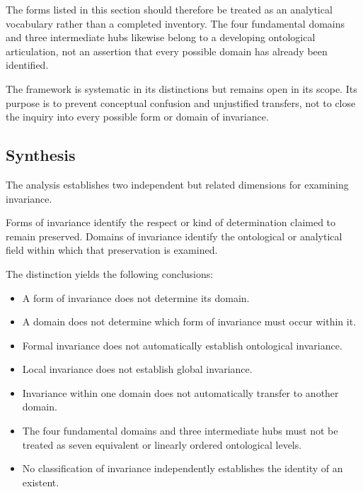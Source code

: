 The forms listed in this section should
therefore be treated as an analytical
vocabulary rather than a completed
inventory. The four fundamental domains
and three intermediate hubs likewise
belong to a developing ontological
articulation, not an assertion that
every possible domain has already
been identified.

The framework is systematic in its
distinctions but remains open in its
scope. Its purpose is to prevent
conceptual confusion and unjustified
transfers, not to close the inquiry
into every possible form or domain
of invariance.

\subsection{Synthesis}

The analysis establishes two independent
but related dimensions for examining
invariance.

Forms of invariance identify the respect
or kind of determination claimed to
remain preserved. Domains of invariance
identify the ontological or analytical
field within which that preservation
is examined.

The distinction yields the following
conclusions:

\begin{itemize}
    \item A form of invariance does not
          determine its domain.

    \item A domain does not determine
          which form of invariance must
          occur within it.

    \item Formal invariance does not
          automatically establish
          ontological invariance.

    \item Local invariance does not
          establish global invariance.

    \item Invariance within one domain
          does not automatically transfer
          to another domain.

    \item The four fundamental domains
          and three intermediate hubs
          must not be treated as seven
          equivalent or linearly ordered
          ontological levels.

    \item No classification of invariance
          independently establishes the
          identity of an existent.
\end{itemize}

